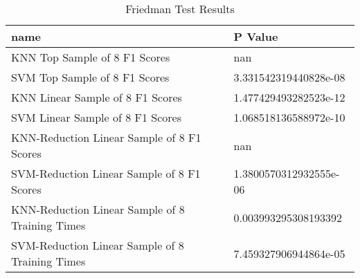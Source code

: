 \begin{table}
\centering
\caption{Friedman Test Results}
\label{tab:friedman_test_results_mushroom}
\begin{tabular}{ll}
\toprule
name & P Value \\
\midrule
KNN Top Sample of 8 F1 Scores & nan \\
SVM Top Sample of 8 F1 Scores & 3.331542319440828e-08 \\
KNN Linear Sample of 8 F1 Scores & 1.477429493282523e-12 \\
SVM Linear Sample of 8 F1 Scores & 1.068518136588972e-10 \\
KNN-Reduction Linear Sample of 8 F1 Scores & nan \\
SVM-Reduction Linear Sample of 8 F1 Scores & 1.3800570312932555e-06 \\
KNN-Reduction Linear Sample of 8 Training Times & 0.003993295308193392 \\
SVM-Reduction Linear Sample of 8 Training Times & 7.459327906944864e-05 \\
\bottomrule
\end{tabular}
\end{table}
